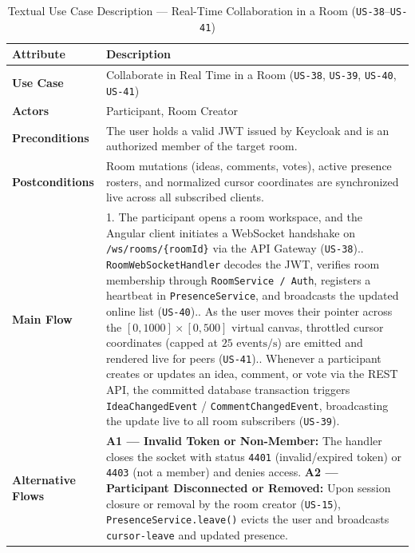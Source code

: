 \begin{table}[htbp]
\centering
\caption{Textual Use Case Description — Real-Time Collaboration in a Room (\texttt{US-38}--\texttt{US-41})}
\label{tab:uc-realtime}
\small
\begin{tabularx}{\textwidth}{@{} l X @{}}
\toprule
\textbf{Attribute} & \textbf{Description} \\
\midrule
\textbf{Use Case} & Collaborate in Real Time in a Room (\texttt{US-38}, \texttt{US-39}, \texttt{US-40}, \texttt{US-41}) \\
\textbf{Actors} & Participant, Room Creator \\
\textbf{Preconditions} & The user holds a valid JWT issued by Keycloak and is an authorized member of the target room. \\
\textbf{Postconditions} & Room mutations (ideas, comments, votes), active presence rosters, and normalized cursor coordinates are synchronized live across all subscribed clients. \\
\textbf{Main Flow} &
1. The participant opens a room workspace, and the Angular client initiates a WebSocket handshake on \texttt{/ws/rooms/\{roomId\}} via the API Gateway (\texttt{US-38}).\newline
2. \texttt{RoomWebSocketHandler} decodes the JWT, verifies room membership through \texttt{RoomService / Auth}, registers a heartbeat in \texttt{PresenceService}, and broadcasts the updated online list (\texttt{US-40}).\newline
3. As the user moves their pointer across the $[0,1000]\times[0,500]$ virtual canvas, throttled cursor coordinates (capped at $25\text{ events/s}$) are emitted and rendered live for peers (\texttt{US-41}).\newline
4. Whenever a participant creates or updates an idea, comment, or vote via the REST API, the committed database transaction triggers \texttt{IdeaChangedEvent} / \texttt{CommentChangedEvent}, broadcasting the update live to all room subscribers (\texttt{US-39}). \\
\textbf{Alternative Flows} &
\textbf{A1 — Invalid Token or Non-Member:} The handler closes the socket with status \texttt{4401} (invalid/expired token) or \texttt{4403} (not a member) and denies access.\newline
\textbf{A2 — Participant Disconnected or Removed:} Upon session closure or removal by the room creator (\texttt{US-15}), \texttt{PresenceService.leave()} evicts the user and broadcasts \texttt{cursor-leave} and updated presence. \\
\bottomrule
\end{tabularx}
\end{table}

